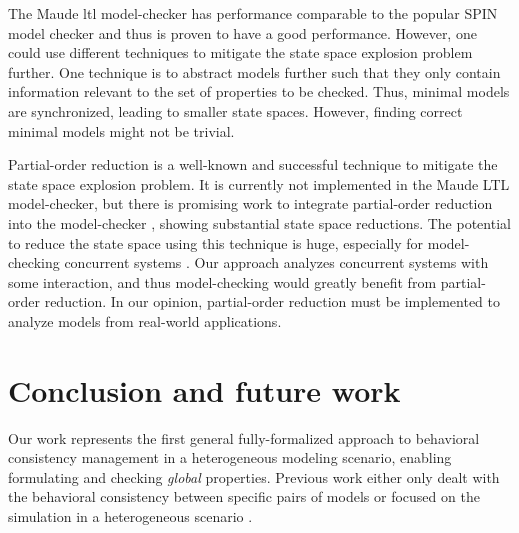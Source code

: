 \documentclass{jot}
\begin{document}
The Maude \gls*{ltl} model-checker has performance comparable to the popular SPIN model checker \cite{ekerMaudeLTLModel2004} and thus is proven to have a good performance.
However, one could use different techniques to mitigate the state space explosion problem further.
One technique is to abstract models further such that they only contain information relevant to the set of properties to be checked.
Thus, minimal models are synchronized, leading to smaller state spaces.
However, finding correct minimal models might not be trivial.

Partial-order reduction is a well-known and successful technique to mitigate the state space explosion problem.
It is currently not implemented in the Maude LTL model-checker, but there is promising work to integrate partial-order reduction into the model-checker \cite{farzanPartialOrderReduction2007}, showing substantial state space reductions.
The potential to reduce the state space using this technique is huge, especially for model-checking concurrent systems \cite{clarkeHandbookModelChecking2018}.
Our approach analyzes concurrent systems with some interaction, and thus model-checking would greatly benefit from partial-order reduction.
In our opinion, partial-order reduction must be implemented to analyze models from real-world applications.


\section{Conclusion and future work} \label{sec:conclusion_and_future_work}
Our work represents the first general fully-formalized approach to behavioral consistency management in a heterogeneous modeling scenario, enabling formulating and checking \emph{global} properties.
Previous work either only dealt with the behavioral consistency between specific pairs of models \cite{yaoConsistencyCheckingUML2006, kusterExplicitBehavioralConsistency2003} or focused on the simulation in a heterogeneous scenario \cite{deantoniModelingBehavioralSemantics2016, varalarsenBCoolBehavioralCoordination2016, ekerTamingHeterogeneityPtolemy2003, leeDisciplinedHeterogeneousModeling2010}.
\end{document}
